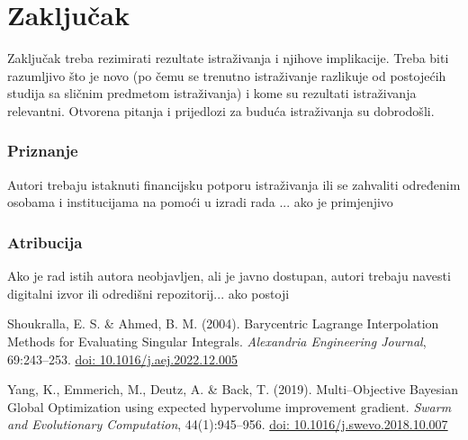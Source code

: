 \documentclass[
  letterpaper,
  DIV=11,
  numbers=noendperiod]{scrartcl}
\begin{document}
	\section{Zaključak}
	Zaključak treba rezimirati rezultate istraživanja i njihove implikacije. Treba biti razumljivo što je novo (po čemu se trenutno istraživanje razlikuje od postojećih studija sa sličnim predmetom istraživanja) i kome su rezultati istraživanja relevantni. Otvorena pitanja i prijedlozi za buduća istraživanja su dobrodošli.
	\vspace{-0.1cm}
	\subsubsection*{Priznanje} Autori trebaju istaknuti financijsku potporu istraživanja ili se zahvaliti određenim osobama i institucijama na pomoći u izradi rada ...{\color{red} ako je primjenjivo}

	\vspace{-0.1cm}
	\subsubsection*{Atribucija} Ako je rad istih autora neobjavljen, ali je javno dostupan, autori trebaju navesti digitalni izvor ili odredišni repozitorij...{\color{red} ako postoji}
	\medskip
	
	\newpage
	
	
	\begin{thebibliography}{99}
		
		Shoukralla, E. S. \& Ahmed, B. M. (2004). Barycentric Lagrange Interpolation Methods for Evaluating Singular Integrals. \emph{Alexandria Engineering Journal}, 69:243--253. \href{https://doi.org/10.1016/j.aej.2022.12.005}{doi: 10.1016/j.aej.2022.12.005}
		
		Yang, K., Emmerich, M., Deutz, A. \& Back, T. (2019). Multi--Objective Bayesian Global Optimization using expected hypervolume improvement gradient. \emph{Swarm and Evolutionary Computation}, 44(1):945--956. \href{https://doi.org/10.1016/j.swevo.2018.10.007}{doi: 10.1016/j.swevo.2018.10.007}
		
		
	\end{thebibliography}
	
\end{document}
